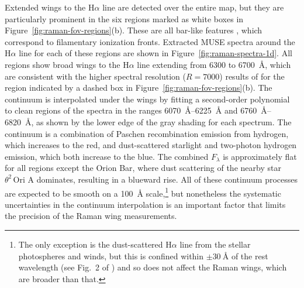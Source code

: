 \documentclass[useAMS, usenatbib, a4paper]{mnras}
\def\th#1#2{\ensuremath{\theta^{#1}\,\text{Ori~#2}}}
\newcommand\ha{\ensuremath{\text{H}\alpha}}
\begin{document}
Extended wings to the \ha{} line are detected over the entire map, but
they are particularly prominent in the six regions marked as white
boxes in Figure~\ref{fig:raman-fov-regions}(b).  These are all
bar-like features \citep{ODell:2000a, Garcia-Diaz:2007a}, which
correspond to filamentary ionization fronts.  Extracted MUSE spectra
around the \ha{} line for each of these regions are shown in
Figure~\ref{fig:raman-spectra-1d}.  All regions show broad wings to
the \ha{} line extending from \num{6300} to \SI{6700}{\angstrom},
which are consistent with the higher spectral resolution
(\(R = 7000\)) results of \citet{Dopita:2016a} for the region
indicated by a dashed box in Figure~\ref{fig:raman-fov-regions}(b).
The continuum is interpolated under the wings by fitting a
second-order polynomial to clean regions of the spectra in the ranges
\SIrange{6070}{6225}{\angstrom} and \SIrange{6760}{6820}{\angstrom},
as shown by the lower edge of the gray shading for each spectrum.  The
continuum is a combination of Paschen recombination emission from
hydrogen, which increases to the red, and dust-scattered starlight and
two-photon hydrogen emission, which both increase to the blue.  The
combined \(F_\lambda\) is approximately flat for all regions except the
Orion Bar, where dust scattering of the nearby star \th2A{} dominates,
resulting in a blueward rise.  All of these continuum processes are
expected to be smooth on a \SI{100}{\angstrom} scale,\footnote{The
  only exception is the dust-scattered \ha{} line from the stellar
  photospheres and winds, but this is confined within
  \(\pm \SI{30}{\angstrom}\) of the rest wavelength (see Fig.~2 of
  \citealp{Simon-Diaz:2006b}) and so does not affect the Raman wings,
  which are broader than that.}  but nonetheless the systematic
uncertainties in the continuum interpolation is an important factor
that limits the precision of the Raman wing measurements.
\end{document}
